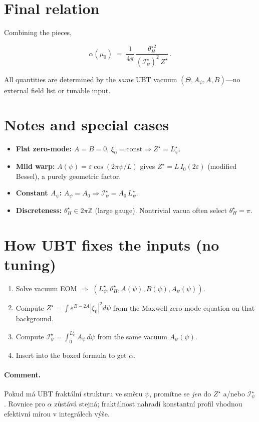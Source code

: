 \documentclass[11pt]{article}
\begin{document}
\section*{Final relation}
Combining the pieces,
\begin{tcolorbox}[colback=white,colframe=black,title={\normalsize Noether $\Rightarrow$ $\alpha$ (UBT-only)}]
\begin{equation*}
\boxed{\quad
\alpha(\mu_0) \;=\; \frac{1}{4\pi}\,\frac{\theta_H^{\star 2}}{(\mathcal I_\psi^\star)^2\,Z^\star}\,.
\quad}
\end{equation*}
\end{tcolorbox}
All quantities are determined by the \emph{same} UBT vacuum $(\Theta, A_\psi, A,B)$---no external field list or tunable input.

\section*{Notes and special cases}
\begin{itemize}
\item \textbf{Flat zero-mode:} $A=B=0$, $\xi_0=\text{const}\Rightarrow Z^\star=L_\psi^\star$.
\item \textbf{Mild warp:} $A(\psi)=\varepsilon\cos(2\pi\psi/L)$ gives $Z^\star=L\,I_0(2\varepsilon)$ (modified Bessel), a purely geometric factor.
\item \textbf{Constant $A_\psi$:} $A_\psi=A_0\Rightarrow \mathcal I_\psi^\star=A_0\,L_\psi^\star$.
\item \textbf{Discreteness:} $\theta_H^\star\in 2\pi\mathbb Z$ (large gauge). Nontrivial vacua often select $\theta_H^\star=\pi$.
\end{itemize}

\section*{How UBT fixes the inputs (no tuning)}
\begin{enumerate}
\item Solve vacuum EOM $\Rightarrow$ $(L_\psi^\star,\theta_H^\star,A(\psi),B(\psi),A_\psi(\psi))$.
\item Compute $Z^\star=\int e^{B-2A}|\xi_0|^2 d\psi$ from the Maxwell zero-mode equation on that background.
\item Compute $\mathcal I_\psi^\star=\int_0^{L_\psi^\star}A_\psi\,d\psi$ from the same vacuum $A_\psi(\psi)$.
\item Insert into the boxed formula to get $\alpha$.
\end{enumerate}

\paragraph{Comment.} Pokud má UBT fraktální strukturu ve směru $\psi$, promítne se \emph{jen} do $Z^\star$ a/nebo $\mathcal I_\psi^\star$. Rovnice pro $\alpha$ zůstává stejná; fraktálnost nahradí konstantní profil vhodnou efektivní mírou v integrálech výše.
\end{document}
